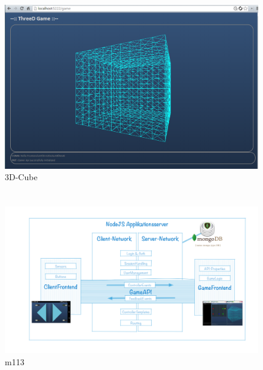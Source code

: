 \documentclass[a4paper]{spie}  %
\begin{document}
\begin{appendices}
\section{}

\begin{figure}[H]
	\centering
	\includegraphics[width=1\textwidth]{images/FrontendInit}
	\caption{3D-Cube}
	\label{3dcube}
\end{figure}

\section{}
\begin{figure}[H]
	\centering
	\includegraphics[width=1\textwidth]{images/arch/M113.png}
	\caption{m113}
	\label{m113}
\end{figure}

  \section{}


\end{appendices}
\end{document}
